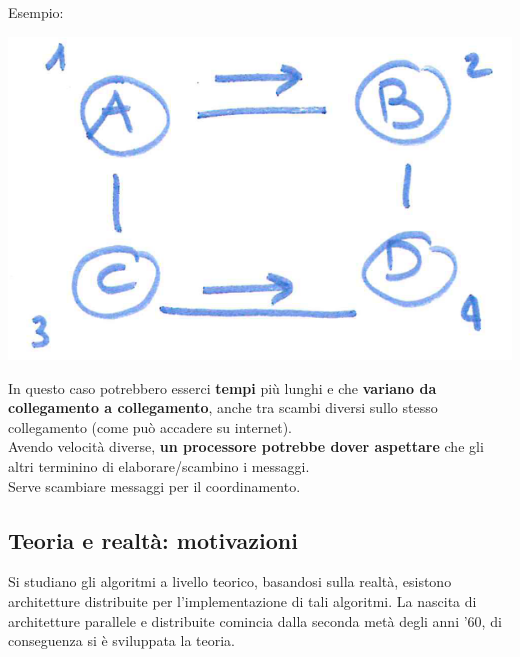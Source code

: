 \documentclass[11pt]{article}
\begin{document}
	Esempio: 
	\begin{center}
		\includegraphics[width=0.6\columnwidth]{img/somm1}
	\end{center}
	
	In questo caso potrebbero esserci \textbf{tempi} più lunghi e che \textbf{variano da collegamento a collegamento}, anche tra scambi diversi sullo stesso collegamento (come può accadere su internet). \\

	Avendo velocità diverse, \textbf{un processore potrebbe dover aspettare} che gli altri terminino di elaborare/scambino i messaggi. \\
	Serve scambiare messaggi per il coordinamento.\\

	\newpage

	\subsection*{Teoria e realtà: motivazioni}
	Si studiano gli algoritmi a livello teorico, basandosi sulla realtà, esistono architetture distribuite per l'implementazione di tali algoritmi. La nascita di architetture parallele e distribuite comincia dalla seconda metà degli anni '60, di conseguenza si è sviluppata la teoria. \\
\end{document}
